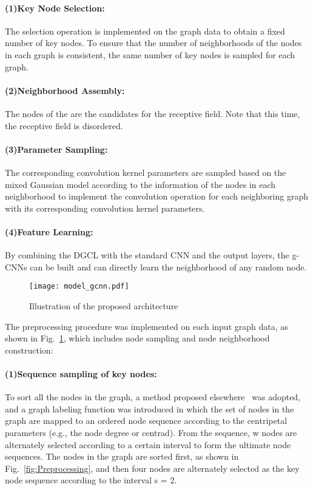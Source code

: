 \documentclass[11pt]{article}
\begin{document}
\paragraph{(1)Key Node Selection:} The selection operation is implemented on the graph data to obtain a fixed number of key nodes. To ensure that the number of neighborhoods of the nodes in each graph is consistent, the same number of key nodes is sampled for each graph.

\paragraph{(2)Neighborhood Assembly:} The nodes of the  are the candidates for the receptive field. Note that this time, the receptive field is disordered.


\paragraph{(3)Parameter Sampling:} The corresponding convolution kernel parameters are sampled based on the mixed Gaussian model according to the information of the nodes in each neighborhood to implement the convolution operation for each neighboring graph with its corresponding convolution kernel parameters.

\paragraph{(4)Feature Learning:} By combining the DGCL with the standard CNN and the output layers, the g-CNNs can be built and can directly learn the neighborhood of any random node.


\begin{figure}
\vspace{-0.1in}
\centering
\texttt{[image: model\_gcnn.pdf]}
\vspace{-0.1in}
\caption{Illustration of the proposed architecture}\label{fig:model_gcnn}
\vspace{-0.2in}
\end{figure}

The preprocessing procedure was implemented on each input graph data, as shown in Fig.~\ref{fig:model_gcnn}, which includes node sampling and node neighborhood construction:

\paragraph{(1)Sequence sampling of key nodes:} To sort all the nodes in the graph, a method proposed elsewhere~\cite{Niepert2016Learning_10} was adopted, and a graph labeling function was introduced in which the set of nodes in the graph are mapped to an ordered node sequence according to the centripetal parameters  (e.g., the node degree or centrad). From the sequence, w nodes are alternately selected according to a certain interval  to form the ultimate node sequences. The nodes in the graph are sorted first, as shown in Fig.~\ref{fig:Preprocessing}, and then four nodes are alternately selected as the key node sequence according to the interval s = 2.
\end{document}
